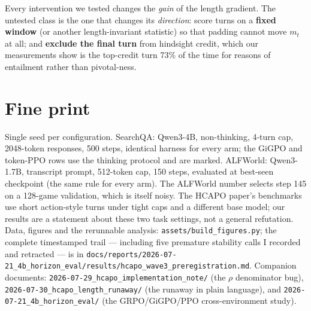 \documentclass[11pt]{article}
\begin{document}
Every intervention we tested changes the \emph{gain} of the length gradient. The untested class is
the one that changes its \emph{direction}: score turns on a \textbf{fixed window} (or another
length-invariant statistic) so that padding cannot move $m_t$ at all; and \textbf{exclude the final
turn} from hindsight credit, which our measurements show is the top-credit turn 73\% of the time
for reasons of entailment rather than pivotal-ness.

\section*{Fine print}
Single seed per configuration. SearchQA: Qwen3-4B, non-thinking, 4-turn cap, 2048-token responses,
500 steps, identical harness for every arm; the GiGPO and token-PPO rows use the thinking protocol
and are marked. ALFWorld: Qwen3-1.7B, transcript prompt, 512-token cap, 150 steps, evaluated at
best-seen checkpoint (the same rule for every arm). The ALFWorld number selects step 145 on a
128-game validation, which is itself noisy. The HCAPO paper's benchmarks use short action-style
turns under tight caps and a different base model; our results are a statement about these two task
settings, not a general refutation. Data, figures and the rerunnable analysis:
\texttt{assets/build\_figures.py}; the complete timestamped trail --- including five premature
stability calls I recorded and retracted --- is in
\texttt{docs/reports/2026-07-21\_4b\_horizon\_eval/results/hcapo\_wave3\_preregistration.md}.
Companion documents: \texttt{2026-07-29\_hcapo\_implementation\_note/} (the $\rho$ denominator bug),
\texttt{2026-07-30\_hcapo\_length\_runaway/} (the runaway in plain language), and
\texttt{2026-07-21\_4b\_horizon\_eval/} (the GRPO/GiGPO/PPO cross-environment study).
\end{document}
